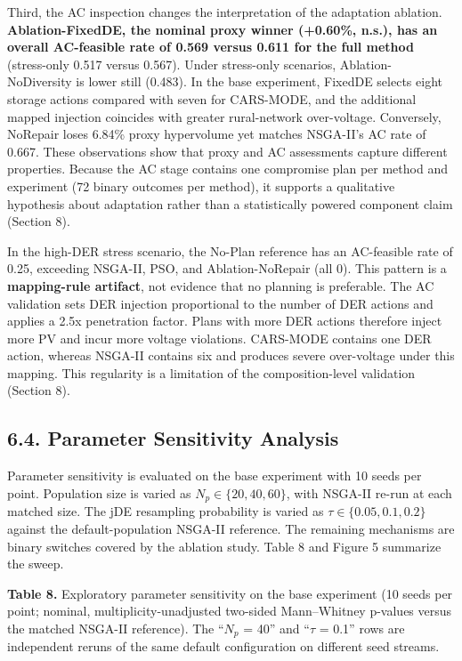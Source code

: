 \documentclass[
  10pt,
  a4paper,
]{article}
\begin{document}
Third, the AC inspection changes the interpretation of the adaptation
ablation. \textbf{Ablation-FixedDE, the nominal proxy winner (+0.60\%,
n.s.), has an overall AC-feasible rate of 0.569 versus 0.611 for the
full method} (stress-only 0.517 versus 0.567). Under stress-only
scenarios, Ablation-NoDiversity is lower still (0.483). In the base
experiment, FixedDE selects eight storage actions compared with seven
for CARS-MODE, and the additional mapped injection coincides with
greater rural-network over-voltage. Conversely, NoRepair loses 6.84\%
proxy hypervolume yet matches NSGA-II's AC rate of 0.667. These
observations show that proxy and AC assessments capture different
properties. Because the AC stage contains one compromise plan per method
and experiment (72 binary outcomes per method), it supports a
qualitative hypothesis about adaptation rather than a statistically
powered component claim (Section 8).

In the high-DER stress scenario, the No-Plan reference has an
AC-feasible rate of 0.25, exceeding NSGA-II, PSO, and Ablation-NoRepair
(all 0). This pattern is a \textbf{mapping-rule artifact}, not evidence
that no planning is preferable. The AC validation sets DER injection
proportional to the number of DER actions and applies a 2.5x penetration
factor. Plans with more DER actions therefore inject more PV and incur
more voltage violations. CARS-MODE contains one DER action, whereas
NSGA-II contains six and produces severe over-voltage under this
mapping. This regularity is a limitation of the composition-level
validation (Section 8).

\subsection{6.4. Parameter Sensitivity
Analysis}\label{parameter-sensitivity-analysis}

Parameter sensitivity is evaluated on the base experiment with 10 seeds
per point. Population size is varied as \(N_p\in\{20,40,60\}\), with
NSGA-II re-run at each matched size. The jDE resampling probability is
varied as \(\tau\in\{0.05,0.1,0.2\}\) against the default-population
NSGA-II reference. The remaining mechanisms are binary switches covered
by the ablation study. Table 8 and Figure 5 summarize the sweep.

\textbf{Table 8.} Exploratory parameter sensitivity on the base
experiment (10 seeds per point; nominal, multiplicity-unadjusted
two-sided Mann--Whitney p-values versus the matched NSGA-II reference).
The ``\(N_p\) = 40'' and ``\(\tau\) = 0.1'' rows are independent reruns
of the same default configuration on different seed streams.
\end{document}
